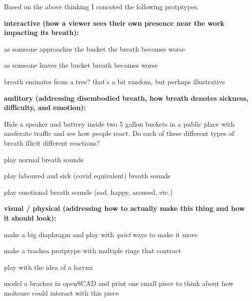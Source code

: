 \documentclass[11pt]{report}
\begin{document}
Based on the above thinking I concoted the following protptypes.



\vspace{1 cm}
\textbf{interactive (how a viewer sees their own presence near the work impacting its breath):}

as someone approaches the bucket the breath becomes worse

as someone leaves the bucket breath becomes worse

breath eminates from a tree? that's a bit random, but perhaps illustrative

\vspace{1 cm}
\textbf{auditory (addressing disembodied breath, how breath denotes sickness, difficulty, and emotion):}

Hide a speaker and battery inside two 5 gallon buckets in a public place with moderate traffic and see how people react. Do each of these different types of breath illicit different reactions?

play normal breath sounds 

play laboured and sick (covid equivalent) breath sounds

play emotional breath sounds (sad, happy, aroused, etc.)


\vspace{1 cm}
\textbf{visual / physical (addressing how to actually make this thing and how it should look):}

make a big diaphragm and play with \textit{quiet} ways to make it move

make a trachea protptype with multiple rings that contract

play with the idea of a larynx

model a brachea in openSCAD and print one small piece to think about how moitsure could interact with this piece
\end{document}
